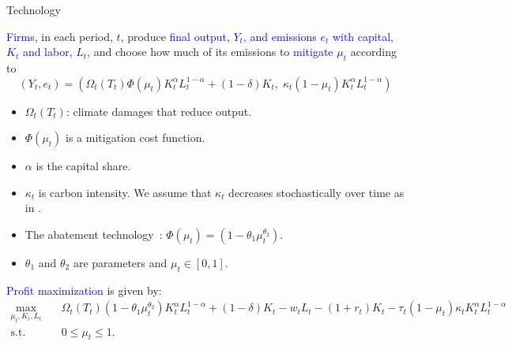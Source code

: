 \documentclass[10pt,aspectratio=169]{beamer}
\begin{document}
\begin{frame}[fragile]{Technology}
\begin{footnotesize}
\textcolor{blue}{Firms}, in each period, $t$, produce \textcolor{blue}{final output, $Y_{t}$, and emissions $e_t$ with capital, $K_{t}$ and labor, $L_{t}$}, and choose how much of its emissions to \textcolor{blue}{mitigate $\mu_t$} according to
\begin{equation} \label{eqFinalOutput}
(Y_t, e_t) = (\Omega_t(T_{t}) \Phi(\mu_t)
 K_t^{\alpha} L_t^{1-\alpha} + (1- \delta) K_t, \; \kappa_t (1-\mu_t)
 K_t^{\alpha} L_t^{1-\alpha})
\end{equation}
\begin{footnotesize}
    \begin{itemize}
\item $\Omega_t(T_{t})$: climate damages that reduce output.
\item $\Phi(\mu_t)$ is a mitigation cost function.
\item $\alpha$ is the capital share.
\item $\kappa_t$ is carbon intensity. We assume that $\kappa_t$ decreases stochastically over time as in \cite{kotlikoffParetoimprovingCarbonriskTaxation2021a}.
\item The abatement technology~\citep[{adapted from}][]{Nordhaus2017}: $\Phi(\mu_t) = (1-\theta_{1}\mu_t^{\theta_2})$.
\item $\theta_{1}$ and $\theta_2$ are parameters and $\mu_t \in [0, 1]$.
\end{itemize}
\end{footnotesize}
\vspace{0.3cm}
\textcolor{blue}{Profit maximization} is given by:
\begin{equation}
    \begin{aligned}
        \max_{\mu_t, K_t, L_t} & \quad \Omega_t(T_{t}) (1-\theta_1\mu_t^{\theta_2}) K_t^{\alpha} L_t^{1-\alpha} + (1- \delta) K_t -w_tL_t-(1+r_t)K_t - \tau_t (1-\mu_t) \kappa_t K_t^{\alpha} L_t^{1-\alpha} \\
        \text{s.t.} & \quad 0 \leq \mu_t \leq 1.
    \end{aligned}
\end{equation}
\end{footnotesize}
\end{frame}
\end{document}
